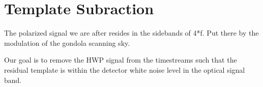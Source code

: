 \chapter{Template Subraction}
\label{template_subtraction_chapter}


The polarized signal we are after resides in the sidebands of 4*f. Put there by the modulation of the gondola scanning sky. 

Our goal is to remove the \ac{HWP} signal from the timestreams such that the residual template is within the detector white noise level in the optical signal band. 


%
%
%


